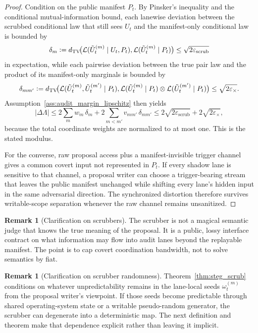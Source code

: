 \documentclass[11pt]{article}
\theoremstyle{definition}
\newtheorem{remark}[theorem]{Remark}
\newcommand{\1}{\mathbf{1}}
\newcommand{\abs}[1]{\left\lvert #1 \right\rvert}
\newcommand{\Defeq}{\vcentcolon=}
\begin{document}
\begin{proof}
Condition on the public manifest $P_t$. By Pinsker's inequality and the conditional mutual-information bound, each lanewise deviation between the scrubbed conditional law that still sees $U_t$ and the manifest-only conditional law is bounded by
\[
\delta_m
\Defeq d_{\mathrm{TV}}\!\bigl(\mathcal L(\tilde U_t^{(m)}\mid U_t,P_t),\mathcal L(\tilde U_t^{(m)}\mid P_t)\bigr)
\le \sqrt{2\varepsilon_{\mathrm{scrub}}}
\]
in expectation, while each pairwise deviation between the true pair law and the product of its manifest-only marginals is bounded by
\[
\delta_{mm'}
\Defeq d_{\mathrm{TV}}\!\bigl(\mathcal L(\tilde U_t^{(m)},\tilde U_t^{(m')}\mid P_t),\mathcal L(\tilde U_t^{(m)}\mid P_t)\otimes \mathcal L(\tilde U_t^{(m')}\mid P_t)\bigr)
\le \sqrt{2\varepsilon_{\times}}.
\]
Assumption~\ref{ass:audit_margin_lipschitz} then yields
\[
\abs{\Delta \Lambda}
\le 2\sum_m w_m \, \delta_m + 2\sum_{m<m'} v_{mm'} \, \delta_{mm'}
\le 2\sqrt{2\varepsilon_{\mathrm{scrub}}}+2\sqrt{2\varepsilon_{\times}},
\]
because the total coordinate weights are normalized to at most one. This is the stated modulus.

For the converse, raw proposal access plus a manifest-invisible trigger channel gives a common covert input not represented in $P_t$. If every shadow lane is sensitive to that channel, a proposal writer can choose a trigger-bearing stream that leaves the public manifest unchanged while shifting every lane's hidden input in the same adversarial direction. The synchronized distortion therefore survives writable-scope separation whenever the raw channel remains unsanitized.
\end{proof}

\begin{remark}[Clarification on scrubbers]
The scrubber is not a magical semantic judge that knows the true meaning of the proposal. It is a public, lossy interface contract on what information may flow into audit lanes beyond the replayable manifest. The point is to cap covert coordination bandwidth, not to solve semantics by fiat.
\end{remark}
\begin{remark}[Clarification on scrubber randomness]
Theorem~\ref{thm:steg_scrub} conditions on whatever unpredictability remains in the lane-local seeds $\omega_t^{(m)}$ from the proposal writer's viewpoint. If those seeds become predictable through shared operating-system state or a writable pseudo-random generator, the scrubber can degenerate into a deterministic map. The next definition and theorem make that dependence explicit rather than leaving it implicit.
\end{remark}
\end{document}
